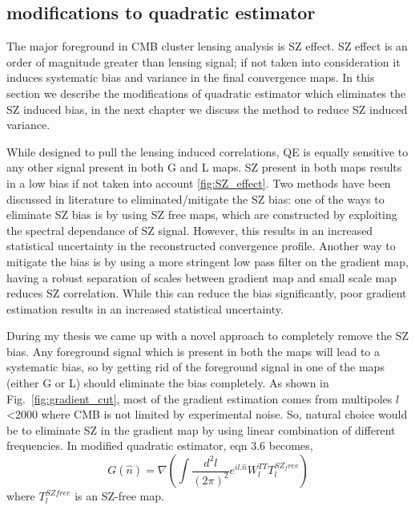  
\subsection{modifications to quadratic estimator}
\label{mqe}
The major foreground in CMB cluster lensing analysis is SZ effect.
SZ effect is an order of magnitude greater than lensing signal; if not taken into consideration it induces systematic bias and variance in the final convergence maps.
In this section we describe the modifications of quadratic estimator which eliminates the SZ induced bias, in the next chapter we discuss the method to reduce SZ induced variance.

While designed to pull the lensing induced correlations, QE is equally sensitive to any other signal present in both G and L maps.
 SZ present in both maps results in a low bias if not taken into account \ref{fig:SZ_effect}.
 Two methods have been discussed in literature to eliminated/mitigate the SZ bias:
 one of the ways to eliminate SZ bias is by using SZ free maps, which are constructed by exploiting the spectral dependance of SZ signal.
 However, this results in an increased statistical uncertainty in the reconstructed convergence profile.
 Another way to mitigate the bias is by using a more stringent low pass filter on the gradient map, having a robust separation of scales between gradient map and small scale map reduces SZ correlation.
 While this can reduce the bias significantly,  poor gradient estimation results in an increased statistical uncertainty.

 
 During my thesis we came up with a novel approach to completely remove the SZ bias. 
 Any foreground signal which is present in both the maps will lead to a systematic bias, so by getting rid of the foreground signal in one of the maps (either G or L) should eliminate the bias completely.
  As shown in Fig.~\ref{fig:gradient_cut}, most of the gradient estimation comes from multipoles $l$ <2000 where CMB is not limited by experimental noise.
  So, natural choice would be to eliminate SZ in the gradient map by using linear combination of different frequencies. 
  In modified quadratic estimator, eqn 3.6 becomes,
  \begin{equation}
   G(\hat{n}) = \nabla (\int\frac{d^{2}l}{(2\pi)^{2}} e^{il .\hat{n}} W^{TT}_{l} T^{SZ_free}_{l}   )
  \end{equation}
  where $T^{SZ free}_{l} $ is an SZ-free map.
